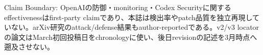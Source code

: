 \begin{claimboundary}
Claim Boundary: OpenAIの防御・monitoring・Codex Securityに関するeffectivenessはfirst-party claimであり、本誌は検出率やpatch品質を独立再現していない。arXiv研究のattack/defense結果もauthor-reportedである。v2/v3 locatorの論文はMarch初回投稿日をchronologyに使い、後日revisionの記述を3月時点へ遡及させない。\autocite{src-3dec299964e6,src-549bffaad22c,src-5becf449a527,src-87dacccfecfd,src-b4b340379768,src-e627c8192172}
\end{claimboundary}

